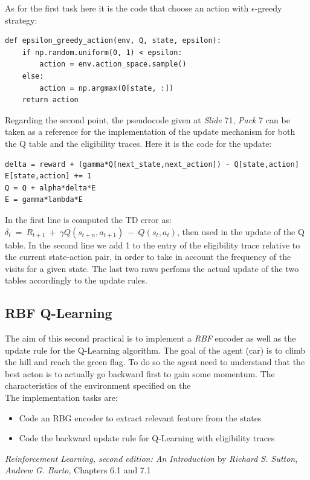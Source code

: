 \documentclass[10pt,a4paper]{article}
\begin{document}
\noindent As for the first task here it is the code that choose an action with $\epsilon$-greedy strategy:
\begin{lstlisting}
def epsilon_greedy_action(env, Q, state, epsilon):
    if np.random.uniform(0, 1) < epsilon:
        action = env.action_space.sample()  
    else:
        action = np.argmax(Q[state, :])
    return action
\end{lstlisting}
\vspace{5pt}

\noindent Regarding the second point, the pseudocode given at \textit{Slide} 71, \textit{Pack} 7 can be taken as a reference for the implementation of the update mechanism for both the Q table and the eligibility traces. Here it is the code for the update:
\begin{lstlisting}
delta = reward + (gamma*Q[next_state,next_action]) - Q[state,action]
E[state,action] += 1
Q = Q + alpha*delta*E
E = gamma*lambda*E
\end{lstlisting}
In the first line is computed the TD error as: $\delta_t  \:=\: R_{t+1} \:+\: \gamma Q(s_{t+n}, a_{t+1}) \:-\: Q(s_t, a_t)$, then used in the update of the Q table. In the second line we add 1 to the entry of the eligibility trace relative to the current state-action pair, in order to take in account the frequency of the visits for a given state. The last two raws perfoms the actual update of the two tables accordingly to the update rules.
\newpage
\subsection{RBF Q-Learning}
The aim of this second practical is to implement a \textit{RBF} encoder as well as the update rule for the Q-Learning algorithm. The goal of the agent (car) is to climb the hill and reach the green flag. To do so the agent need to understand that the best acton is to actually go backward first to gain some momentum. The characteristics of the environment specified on the  \\
 The implementation tasks are:
\begin{itemize}
    \item Code an RBG encoder to extract relevant feature from the states
    \item Code the backward update rule for Q-Learning with eligibility traces
\end{itemize}
\newpage

\begin{thebibliography}{9}
    \emph{Reinforcement Learning, second edition: An Introduction} by \textit{Richard S. Sutton}, \textit{Andrew G. Barto}, Chapters 6.1 and 7.1 

\end{thebibliography}
\end{document}
